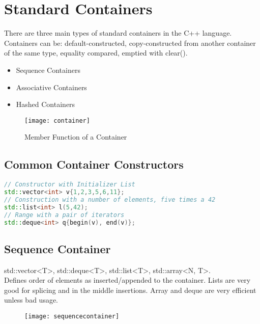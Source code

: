 \section{Standard Containers}
There are three main types of standard containers in the C++ language. \\ Containers can be: default-constructed, copy-constructed from another container of the same type, equality compared, emptied with clear().
\begin{itemize}
	\itemsep -0.5em
	\item Sequence Containers
	\item Associative Containers
	\item Hashed Containers
\end{itemize}

\begin{figure}[h!]
  \centering
  \texttt{[image: container]}
  \caption{Member Function of a Container}
\end{figure}

\subsection{Common Container Constructors}

\begin{lstlisting}[language=C++]
// Constructor with Initializer List
std::vector<int> v{1,2,3,5,6,11};
// Construction with a number of elements, five times a 42
std::list<int> l(5,42);
// Range with a pair of iterators
std::deque<int> q{begin(v), end(v)};
\end{lstlisting}

\subsection{Sequence Container}
std::vector<T>, std::deque<T>, std::list<T>, std::array<N, T>.\\
Defines order of elements as inserted/appended to the container. Lists are very good for splicing and in the middle insertions. Array and deque are very efficient unless bad usage.

\begin{figure}[h!]
 	\centering
 	\texttt{[image: sequencecontainer]}
  \caption{}
\end{figure}


